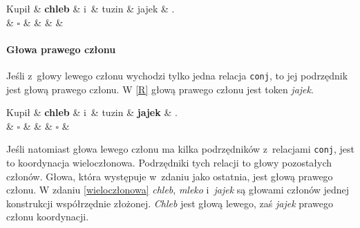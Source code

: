 \begin{exe}
\ex \label{L}
\begin{dependency}[baseline=0.9ex]
\begin{deptext}[column sep=1em, row sep=.1ex]
Kupił \& \textbf{chleb} \& i~\& tuzin \& jajek \& .  \\ 
 \& \textbf{$\square$} \&  \&  \& \&  \\ 
\end{deptext}
\end{dependency}
\end{exe}

\paragraph{Głowa prawego członu}

Jeśli z~głowy lewego członu wychodzi tylko jedna relacja \texttt{conj}, to jej podrzędnik jest głową prawego członu. W \eqref{R} głową prawego członu jest token \textit{jajek}.

\begin{exe}
\ex \label{R}
\begin{dependency}[baseline=0.9ex]
\begin{deptext}[column sep=1em, row sep=.1ex]
Kupił \& \textbf{chleb} \& i~\& tuzin \& \textbf{jajek} \& .  \\ 
 \& \textbf{$\square$} \&  \&  \& \textbf{$\square$} \&  \\ 
\end{deptext}
\end{dependency}
\end{exe}

Jeśli natomiast głowa lewego członu ma kilka podrzędników z~relacjami \texttt{conj}, jest to koordynacja wieloczłonowa. Podrzędniki tych relacji to głowy pozostałych członów. Głowa, która występuje w~zdaniu jako ostatnia, jest głową prawego członu. W zdaniu \eqref{wieloczłonowa} \textit{chleb}, \textit{mleko} i~\textit{jajek} są głowami członów jednej konstrukcji współrzędnie złożonej. \textit{Chleb} jest głową lewego, zaś \textit{jajek} prawego członu koordynacji.

